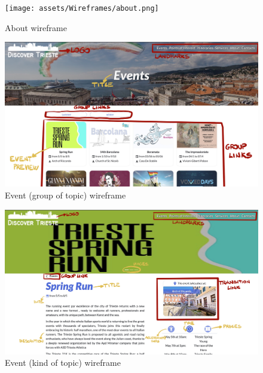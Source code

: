 \documentclass[table, 12pt]{article}
\begin{document}
\begin{figure}[H]
    \begin{center}
        \texttt{[image: assets/Wireframes/about.png]}
        \caption{About wireframe}
    \end{center}
\end{figure}

\begin{figure}[H]
    \begin{center}
        \includegraphics[width=\textwidth]{assets/Wireframes/allEvents.png}
        \caption{Event (group of topic) wireframe}
    \end{center}
\end{figure}

\begin{figure}[H]
    \begin{center}
        \includegraphics[width=\textwidth]{assets/Wireframes/event.png}
        \caption{Event (kind of topic) wireframe}
    \end{center}
\end{figure}
\end{document}
